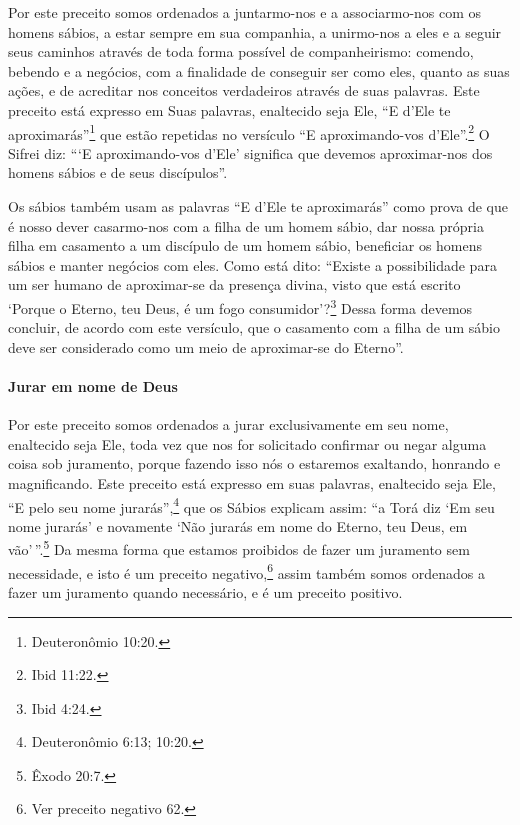 Por este preceito somos ordenados a juntarmo-nos e a associarmo-nos com
os homens sábios, a estar sempre em sua companhia, a unirmo-nos a eles e
a seguir seus caminhos através de toda forma possível de
companheirismo: comendo, bebendo e a negócios, com a finalidade de
conseguir ser como eles, quanto as suas ações, e de acreditar nos
conceitos verdadeiros através de suas palavras. Este preceito está
expresso em Suas palavras, enaltecido seja Ele, ``E d'Ele te
aproximarás''\footnote{Deuteronômio 10:20.} que estão 
repetidas no versículo ``E aproximando-vos d'Ele''.\footnote{Ibid 11:22.}
O Sifrei diz: ```E aproximando-vos d'Ele' significa que devemos aproximar-nos dos homens sábios e de seus discípulos''.

Os sábios também usam as palavras ``E d'Ele te aproximarás'' como prova
de que é nosso dever casarmo-nos com a filha de um homem sábio, dar
nossa própria filha em casamento a um discípulo de um homem sábio,
beneficiar os homens sábios e manter negócios com eles. Como está dito:
``Existe a possibilidade para um ser humano de aproximar-se da presença
divina, visto que está escrito `Porque o Eterno, teu Deus, é um fogo
consumidor'?\footnote{Ibid 4:24.} Dessa forma devemos concluir, de acordo com
este versículo, que o casamento com a filha de um sábio deve ser
considerado como um meio de aproximar-se do Eterno''.

\paragraph{Jurar em nome de Deus}

Por este preceito somos ordenados a jurar exclusivamente em seu nome,
enaltecido seja Ele, toda vez que nos for solicitado confirmar ou negar
alguma coisa sob juramento, porque fazendo isso nós o estaremos
exaltando, honrando e magnificando. Este preceito está expresso em suas
palavras, enaltecido seja Ele, ``E pelo seu nome jurarás'',\footnote{Deuteronômio 6:13; 10:20.} que os Sábios explicam assim: ``a Torá diz
`Em seu nome jurarás' e novamente `Não jurarás em nome do Eterno, teu
Deus, em vão'\,''.\footnote{Êxodo 20:7.} Da mesma forma que estamos proibidos de
fazer um juramento sem necessidade, e isto é um preceito
negativo,\footnote{Ver preceito negativo 62.} assim também somos ordenados a fazer um juramento quando necessário, e é um preceito positivo.

